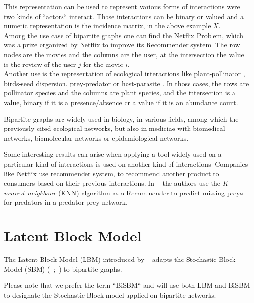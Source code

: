 \documentclass[12pt,a4paper]{report}
\begin{document}
This representation can be used to represent various forms of interactions were
two kinds of ``actors`` interact. Those interactions can be binary or valued and
a numeric representation is the incidence matrix, in the above example $X$.\\

Among the use case of bipartite graphs one can find the Netflix Problem, which
was a prize organized by Netflix to improve its Recommender system. The row
nodes are the movies and the columns are the user, at the intersection the value
is the review of the user $j$ for the movie $i$.\\

Another use is the representation of ecological interactions like
plant-pollinator \parencite{ramos-jilibertoTopologicalChangeAndean2010}, birds-seed
dispersion, prey-predator or
host-parasite \parencite{kaszewska-gilasGlobalStudiesHostParasite2021}.
In those cases, the rows are pollinator species and the columns are plant
species, and the intersection is a value, binary if it is a presence/absence or
a value if it is an abundance count.

Bipartite graphs are widely used in biology, in various fields, among which the
previously cited ecological networks, but also in medicine with biomedical
networks, biomolecular networks or epidemiological
networks. \parencite{pavlopoulosBipartiteGraphsSystems2018}


Some interesting results can arise when applying a tool widely used on a particular
kind of interactions is used on another kind of interactions. Companies like
Netflix use recommender system, to recommend another product to consumers based
on their previous interactions.
In ~\cite{desjardins-proulxEcologicalInteractionsNetflix2017} the authors use the
\emph{K-nearest neighbour} (KNN) algorithm as a Recommender to predict missing
preys for predators in a predator-prey network.

\section{Latent Block Model}
\label{sec:latent-block-model}
The Latent Block Model (LBM) introduced by ~\cite{govaertLatentBlockModel2010}
adapts the Stochastic Block Model (SBM)
(~\cite{hollandStochasticBlockmodelsFirst1983};~\cite{snijdersEstimationPredictionStochastic1997})
to bipartite graphs.

\begin{small}
    Please note that we prefer the term ``BiSBM`` and will use both LBM and BiSBM to
    designate the Stochastic Block model applied on bipartite networks.
\end{small}
\end{document}
